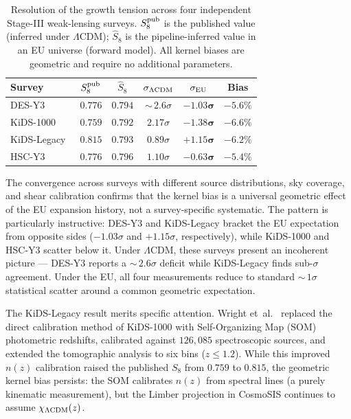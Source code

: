 \documentclass[a4paper,fleqn]{cas-dc}
\begin{document}
\begin{table}[t]
\caption{Resolution of the growth tension across four
independent Stage-III weak-lensing surveys. $S_8^{\rm pub}$
is the published value (inferred under $\Lambda$CDM);
$\hat{S}_8$ is the pipeline-inferred value in an EU
universe (forward model). All kernel biases are
geometric and require no additional parameters.}
\label{tab:s8}
\begin{tabular}{lccccc}
Survey & $S_8^{\rm pub}$ & $\hat{S}_8$ &
  $\sigma_{\Lambda\rm CDM}$ &
  $\sigma_{\rm EU}$ & Bias \\
\hline
DES-Y3        & $0.776$ & $0.794$ &
  ${\sim}\,2.6\sigma$ & $\mathbf{-1.03\sigma}$ & $-5.6\%$ \\
KiDS-1000~\cite{heymans2021}
  & $0.759$ & $0.792$ &
  $2.17\sigma$ & $\mathbf{-1.38\sigma}$ & $-6.6\%$ \\
KiDS-Legacy~\cite{wright2025}
  & $0.815$ & $0.793$ &
  $0.89\sigma$ & $\mathbf{+1.15\sigma}$ & $-6.2\%$ \\
HSC-Y3~\cite{li2023_hsc}
  & $0.776$ & $0.796$ &
  $1.10\sigma$ & $\mathbf{-0.63\sigma}$ & $-5.4\%$ \\
\end{tabular}
\end{table}

The convergence across surveys with different source
distributions, sky coverage, and shear calibration confirms
that the kernel bias is a universal geometric effect of the
EU expansion history, not a survey-specific systematic.
The pattern is particularly instructive: DES-Y3 and
KiDS-Legacy bracket the EU expectation from opposite
sides ($-1.03\sigma$ and $+1.15\sigma$, respectively),
while KiDS-1000 and HSC-Y3 scatter below it. Under
$\Lambda$CDM, these surveys present an incoherent picture
--- DES-Y3 reports a ${\sim}\,2.6\sigma$ deficit while
KiDS-Legacy finds sub-$\sigma$ agreement. Under the EU,
all four measurements reduce to standard
${\sim}\,1\sigma$ statistical scatter around a common
geometric expectation.

The KiDS-Legacy result merits specific attention. Wright
et~al.~\cite{wright2025} replaced the direct calibration
method of KiDS-1000 with Self-Organizing Map (SOM)
photometric redshifts, calibrated against $126{,}085$
spectroscopic sources, and extended the tomographic
analysis to six bins ($z \leq 1.2$). While this
improved $n(z)$ calibration raised the published $S_8$
from $0.759$ to $0.815$, the geometric kernel bias
persists: the SOM calibrates $n(z)$ from spectral lines
(a purely kinematic measurement), but the Limber
projection in CosmoSIS continues to assume
$\chi_{\Lambda{\rm CDM}}(z)$.
\end{document}
